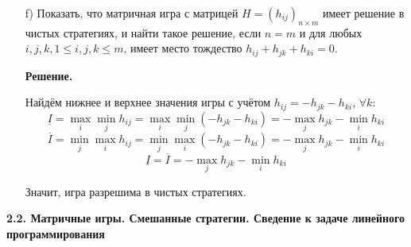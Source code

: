\documentclass[a4paper,14pt]{extreport}
\begin{document}
\begin{itemize}
\item[f)] Показать, что матричная игра с матрицей $H=(h_{ij})_{n \times m}$  имеет решение в чистых стратегиях, и найти такое решение, если $n = m$ и для любых $i, j, k, 1 \le i, j, k \le m$, имеет место тождество $h_{ij}+h_{jk} + h_{ki}= 0$.

\textbf{Решение.} 

Найдём нижнее и верхнее значения игры с учётом $h_{ij} = -h_{jk} - h_{ki}$, $\forall k$:
$$
\underline{I} = \max_i \min_j h_{ij} = \max_i \min_j \left( -h_{jk} - h_{ki} \right) = -\max_j h_{jk} - \min_i h_{ki}
$$ $$
\overline{I} = \min_j \max_i h_{ij} = \min_j \max_i \left( -h_{jk} - h_{ki} \right) = -\max_j h_{jk} - \min_i h_{ki}
$$ $$
\underline{I} = \overline{I} = -\max_j h_{jk} - \min_i h_{ki}
$$

Значит, игра разрешима в чистых стратегиях.
\newline

\end{itemize}

\begin{center}
	\textbf{2.2. Матричные игры. Смешанные стратегии. Сведение к задаче линейного программирования}
\end{center}
\end{document}
